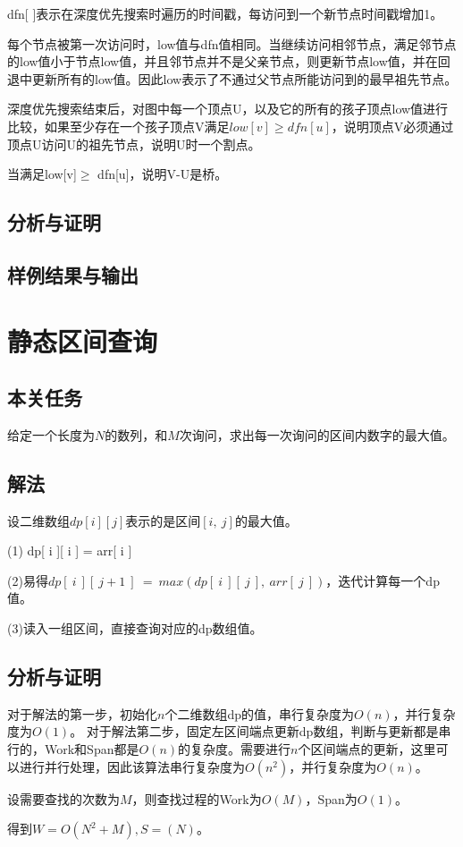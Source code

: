 \documentclass[UTF8,a4paperdui, %
]{ctexart}
\begin{document}
dfn[ ]表示在深度优先搜索时遍历的时间戳，每访问到一个新节点时间戳增加1。

每个节点被第一次访问时，low值与dfn值相同。当继续访问相邻节点，满足邻节点的low值小于节点low值，并且邻节点并不是父亲节点，则更新节点low值，并在回退中更新所有的low值。因此low表示了不通过父节点所能访问到的最早祖先节点。

深度优先搜索结束后，对图中每一个顶点U，以及它的所有的孩子顶点low值进行比较，如果至少存在一个孩子顶点V满足$low[v]\geq dfn[u]$，说明顶点V必须通过顶点U访问U的祖先节点，说明U时一个割点。

当满足low[v]$\geq$ dfn[u]，说明V-U是桥。
\subsection{分析与证明}
\subsection{样例结果与输出}
\section{静态区间查询}
\subsection{本关任务}
给定一个长度为$N$的数列，和$M$次询问，求出每一次询问的区间内数字的最大值。
\subsection{解法}
设二维数组$dp[i][j]$表示的是区间$[i,\ j]$的最大值。

(1) dp[ i ][ i ] = arr[ i ]

(2)易得$dp[\ i\ ][\ j+1\ ]\ =\ max(dp[\ i\ ][\ j\ ],\ arr[\ j\ ])$，迭代计算每一个dp值。

(3)读入一组区间，直接查询对应的dp数组值。
\subsection{分析与证明}
对于解法的第一步，初始化$n$个二维数组dp的值，串行复杂度为$O(n)$，并行复杂度为$O(1)$。
对于解法第二步，固定左区间端点更新dp数组，判断与更新都是串行的，Work和Span都是$O(n)$的复杂度。需要进行$n$个区间端点的更新，这里可以进行并行处理，因此该算法串行复杂度为$O(n^2)$，并行复杂度为$O(n)$。

设需要查找的次数为$M$，则查找过程的Work为$O(M)$，Span为$O(1)$。

得到$W=O(N^2+M),S=(N)$。
\end{document}
